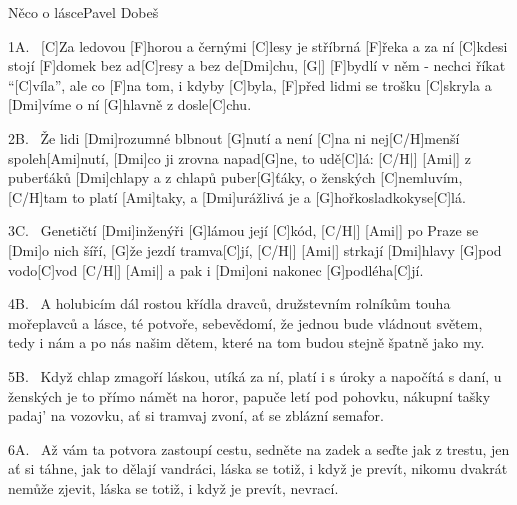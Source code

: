 \begin{song}{Něco o lásce}{Pavel Dobeš}

\begin{xverse}{1A.~}
[\large C]Za ledovou [\large F]horou a černými [\large C]lesy
je stříbrná [\large F]{ře}ka a za ní [\large C]kdesi
stojí [\large F]domek bez ad[\large C]resy a bez de[\large Dmi]chu, [\large G|]{}
[\large F]bydlí v něm - nechci říkat ``[\large C]víla'',
ale co [\large F]na tom, i kdyby [\large C]byla,
[\large F]před lidmi se trošku [\large C]skryla
a [\large Dmi]víme o ní [\large G]hlavně z dosle[\large C]chu.
\end{xverse}

\begin{xverse}{2B.~}
Že lidi [\large Dmi]rozumné blbnout [\large G]nutí
a není [\large C]na ni nej[\large C/H]menší spoleh[\large Ami]nutí,
[\large Dmi]co ji zrovna napad[\large G]ne, to udě[\large C]lá:  [\large C/H|]{} [\large Ami|]{}
z puberťáků [\large Dmi]chlapy a z chlapů puber[\large G]{ťá}ky,
o ženských [\large C]nemluvím, [\large C/H]tam to platí [\large Ami]taky,
a [\large Dmi]urážlivá je a [\large G]hořkosladkokyse[\large C]lá.
\end{xverse}

\begin{xverse}{3C.~}
Genetičtí [\large Dmi]inženýři [\large G]lámou její [\large C]kód, [\large C/H|]{} [\large Ami|]{}
po Praze se [\large Dmi]o nich šíří, [\large G]{že} jezdí tramva[\large C]jí, [\large C/H|]{} [\large Ami|]{}
strkají [\large Dmi]hlavy [\large G]pod vodo[\large C]vod  [\large C/H|]{} [\large Ami|]{}
a pak i [\large Dmi]oni nakonec [\large G]podléha[\large C]jí.
\end{xverse}

\begin{xverse}{4B.~}
A holubicím dál rostou křídla dravců,
družstevním rolníkům touha mořeplavců
a lásce, té potvoře, sebevědomí,
že jednou bude vládnout světem,
tedy i nám a po nás našim dětem,
které na tom budou stejně špatně jako my.
\end{xverse}

\begin{xverse}{5B.~}
Když chlap zmagoří láskou, utíká za ní,
platí i s úroky a napočítá s daní,
u ženských je to přímo námět na horor,
papuče letí pod pohovku,
nákupní tašky padaj' na vozovku,
ať si tramvaj zvoní, ať se zblázní semafor.
\end{xverse}

\begin{xverse}{6A.~}
Až vám ta potvora zastoupí cestu,
sedněte na zadek a seďte jak z trestu,
jen ať si táhne, jak to dělají vandráci,
láska se totiž, i když je prevít,
nikomu dvakrát nemůže zjevit,
láska se totiž, i když je prevít, nevrací.
\end{xverse}


\end{song}
